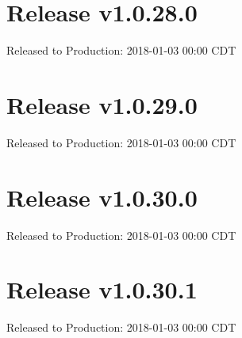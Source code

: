 \documentclass{article}%
\begin{document}
%
\section{Release v1.0.28.0}%
\label{sec:Release v1.0.28.0}%
Released to Production: 2018{-}01{-}03 00:00 CDT%
\newline%

%
\section{Release v1.0.29.0}%
\label{sec:Release v1.0.29.0}%
Released to Production: 2018{-}01{-}03 00:00 CDT%
\newline%

%
\section{Release v1.0.30.0}%
\label{sec:Release v1.0.30.0}%
Released to Production: 2018{-}01{-}03 00:00 CDT%
\newline%

%
\section{Release v1.0.30.1}%
\label{sec:Release v1.0.30.1}%
Released to Production: 2018{-}01{-}03 00:00 CDT%
\newline%

%
\end{document}
